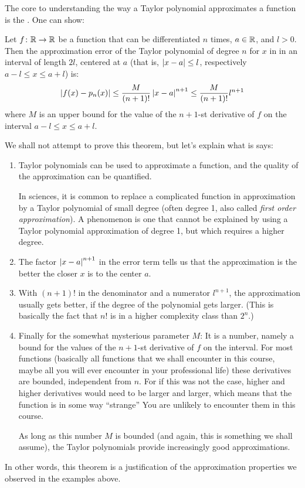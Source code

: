 The core to understanding the way a Taylor polynomial approximates a
function is the . One can show:
\begin{thm}
Let $f\colon{\mathbb R}\to{\mathbb R}$ be  a function that can be differentiated $n$ times,
$a\in{\mathbb R}$, and $l>0$.
Then the approximation error of the Taylor polynomial of degree $n$ for
$x$ in in an interval of length $2l$, centered at $a$ (that is,
$\left|x-a\right|\le l$, respectively $a-l\le x\le a+l$) is:
\[
\left|f(x)-p_n(x)\right|\le \frac{M}{(n+1)!}\left|x-a\right|^{n+1}\le \frac{M}{(n+1)!}l^{n+1}
\]
where $M$ is an upper bound for the value of the $n+1$-st derivative of $f$
on the interval $a-l\le x\le a+l$.
\end{thm}
We shall not attempt to prove this theorem, but let's explain what is says:
\begin{enumerate}
\item
Taylor polynomials can be used to approximate a function, and the quality of
the approximation can be quantified.

In sciences, it is common to replace a complicated function in
approximation by a Taylor polynomial of small degree (often degree 1, also
called {\em first order approximation}). A
 phenomenon is one that cannot be explained by using a
Taylor polynomial approximation of degree 1, but which requires a higher
degree.
\item 
The factor $\left|x-a\right|^{n+1}$ in the error term tells us that the
approximation is the better the closer $x$ is to the center $a$.
\item
With $(n+1)!$ in the denominator and a numerator $l^{n+1}$, the
approximation usually gets better, if the degree of the polynomial gets
larger. (This is basically the fact that $n!$ is in a higher complexity
class than $2^n$.)

\item
Finally for the somewhat mysterious parameter $M$: It is a number, namely a
bound for the values of the $n+1$-st derivative of $f$ on the interval. For
most functions (basically all functions that we shall encounter in this
course, maybe all you will ever encounter in your professional life) these
derivatives are bounded, independent from $n$. For if this was not the case,
higher and higher derivatives would need to be larger and larger, which
means that the function is in some way ``strange'' You are unlikely to encounter them in this course.

As long as this number $M$ is bounded (and again, this is something we shall
assume), the Taylor polynomials provide increasingly good approximations.
\end{enumerate}
In other words, this theorem is a justification of the approximation
properties we observed in the examples above.\smallskip

